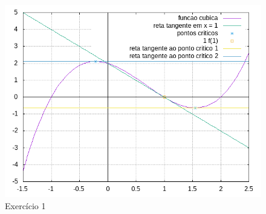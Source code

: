 \documentclass{article}
\begin{document}
    \begin{figure}[!htb]
       \centering %
        \includegraphics[scale=0.7]{exercicio1part.png}
        \caption{Exercício 1}
        \label{img:Exercício 1}
    \end{figure}
    
\end{document}
